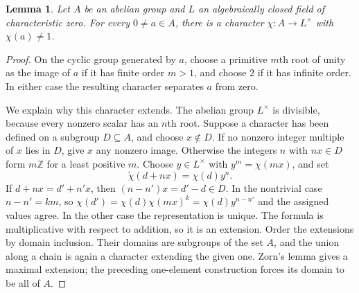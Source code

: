 \documentclass[11pt,letterpaper]{article}
\newtheorem{lemma}[theorem]{Lemma}
\theoremstyle{definition}
\theoremstyle{remark}
\newcommand{\Z}{\mathbb Z}
\begin{document}
\begin{lemma}\label{bst:lem:characters}
Let $A$ be an abelian group and $L$ an algebraically closed field of
characteristic zero. For every $0\ne a\in A$, there is a character
$\chi:A\to L^\times$ with $\chi(a)\ne1$.
\end{lemma}
\begin{proof}
On the cyclic group generated by $a$, choose a primitive $m$th root of
unity as the image of $a$ if it has finite order $m>1$, and choose $2$ if
it has infinite order. In either case the resulting character separates
$a$ from zero.

We explain why this character extends. The abelian group $L^\times$ is
divisible, because every nonzero scalar has an $n$th root. Suppose a
character has been defined on a subgroup $D\subseteq A$, and choose
$x\notin D$. If no nonzero integer multiple of $x$ lies in $D$, give $x$
any nonzero image. Otherwise the integers $n$ with $nx\in D$ form $m\Z$
for a least positive $m$. Choose $y\in L^\times$ with
$y^m=\chi(mx)$, and set
\[
 \widetilde\chi(d+nx)=\chi(d)y^n.
\]
If $d+nx=d'+n'x$, then $(n-n')x=d'-d\in D$.
In the nontrivial case $n-n'=km$, so
$\chi(d')=\chi(d)\chi(mx)^k=\chi(d)y^{n-n'}$ and the assigned values
agree. In the other case the representation is unique. The formula is
multiplicative with respect to addition, so it is an extension.
Order the extensions by domain inclusion. Their domains are subgroups of
the set $A$, and the union along a chain is again a character extending
the given one. Zorn's lemma gives a maximal extension; the preceding
one-element construction forces its domain to be all of $A$.
\end{proof}
\end{document}
